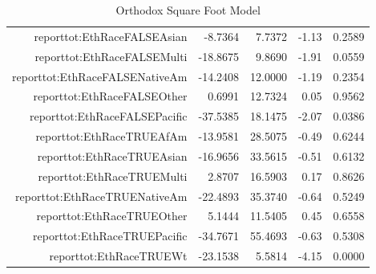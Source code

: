 \documentclass{article}
\begin{document}
\begin{table}[ht]
\begin{tabular}{rrrrr}
$$  reporttot:EthRaceFALSEAsian & -8.7364 & 7.7372 & -1.13 & 0.2589 \\ 
  reporttot:EthRaceFALSEMulti & -18.8675 & 9.8690 & -1.91 & 0.0559 \\ 
  reporttot:EthRaceFALSENativeAm & -14.2408 & 12.0000 & -1.19 & 0.2354 \\ 
  reporttot:EthRaceFALSEOther & 0.6991 & 12.7324 & 0.05 & 0.9562 \\ 
  reporttot:EthRaceFALSEPacific & -37.5385 & 18.1475 & -2.07 & 0.0386 \\ 
  reporttot:EthRaceTRUEAfAm & -13.9581 & 28.5075 & -0.49 & 0.6244 \\ 
  reporttot:EthRaceTRUEAsian & -16.9656 & 33.5615 & -0.51 & 0.6132 \\ 
  reporttot:EthRaceTRUEMulti & 2.8707 & 16.5903 & 0.17 & 0.8626 \\ 
  reporttot:EthRaceTRUENativeAm & -22.4893 & 35.3740 & -0.64 & 0.5249 \\ 
  reporttot:EthRaceTRUEOther & 5.1444 & 11.5405 & 0.45 & 0.6558 \\ 
  reporttot:EthRaceTRUEPacific & -34.7671 & 55.4693 & -0.63 & 0.5308 \\ 
  reporttot:EthRaceTRUEWt & -23.1538 & 5.5814 & -4.15 & 0.0000 \\ 
   \hline
\end{tabular}
\caption{Orthodox Square Foot Model} 
\label{tab:OrthoSQFT}
\end{table}
\end{document}

